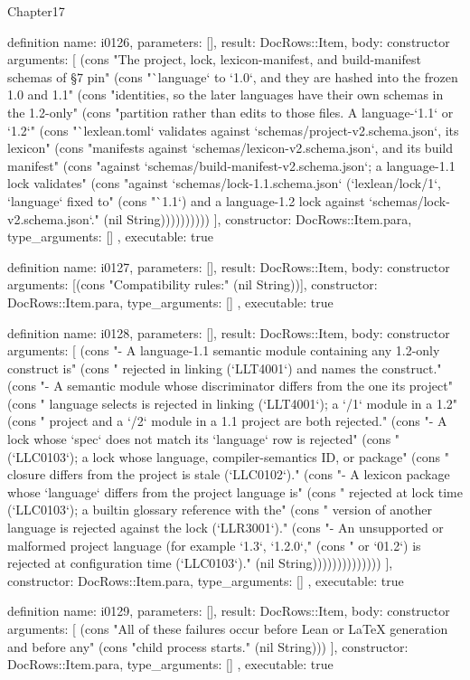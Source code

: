 \begin{lexlean}{Chapter17}
\begin{semanticmodule}
definition{
  name: i0126,
  parameters: [],
  result: DocRows::Item,
  body: constructor{
    arguments: [
      (cons "The project, lock, lexicon-manifest, and build-manifest schemas of §7 pin" (cons "`language` to `1.0`, and they are hashed into the frozen 1.0 and 1.1" (cons "identities, so the later languages have their own schemas in the 1.2-only" (cons "partition rather than edits to those files. A language-`1.1` or `1.2`" (cons "`lexlean.toml` validates against `schemas/project-v2.schema.json`, its lexicon" (cons "manifests against `schemas/lexicon-v2.schema.json`, and its build manifest" (cons "against `schemas/build-manifest-v2.schema.json`; a language-1.1 lock validates" (cons "against `schemas/lock-1.1.schema.json` (`lexlean/lock/1`, `language` fixed to" (cons "`1.1`) and a language-1.2 lock against `schemas/lock-v2.schema.json`." (nil String))))))))))
    ],
    constructor: DocRows::Item.para,
    type_arguments: []
  },
  executable: true
}

definition{
  name: i0127,
  parameters: [],
  result: DocRows::Item,
  body: constructor{
    arguments: [(cons "Compatibility rules:" (nil String))],
    constructor: DocRows::Item.para,
    type_arguments: []
  },
  executable: true
}

definition{
  name: i0128,
  parameters: [],
  result: DocRows::Item,
  body: constructor{
    arguments: [
      (cons "- A language-1.1 semantic module containing any 1.2-only construct is" (cons "  rejected in linking (`LLT4001`) and names the construct." (cons "- A semantic module whose discriminator differs from the one its project" (cons "  language selects is rejected in linking (`LLT4001`); a `/1` module in a 1.2" (cons "  project and a `/2` module in a 1.1 project are both rejected." (cons "- A lock whose `spec` does not match its `language` row is rejected" (cons "  (`LLC0103`); a lock whose language, compiler-semantics ID, or package" (cons "  closure differs from the project is stale (`LLC0102`)." (cons "- A lexicon package whose `language` differs from the project language is" (cons "  rejected at lock time (`LLC0103`); a builtin glossary reference with the" (cons "  version of another language is rejected against the lock (`LLR3001`)." (cons "- An unsupported or malformed project language (for example `1.3`, `1.2.0`," (cons "  or `01.2`) is rejected at configuration time (`LLC0103`)." (nil String))))))))))))))
    ],
    constructor: DocRows::Item.para,
    type_arguments: []
  },
  executable: true
}

definition{
  name: i0129,
  parameters: [],
  result: DocRows::Item,
  body: constructor{
    arguments: [
      (cons "All of these failures occur before Lean or LaTeX generation and before any" (cons "child process starts." (nil String)))
    ],
    constructor: DocRows::Item.para,
    type_arguments: []
  },
  executable: true
}


\end{semanticmodule}
\end{lexlean}
